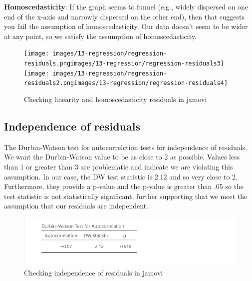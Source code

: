 \documentclass[
]{book}
\begin{document}
\textbf{Homoscedasticity}: If the graph seems to funnel (e.g., widely dispersed on one end of the x-axis and narrowly dispersed on the other end), then that suggests you fail the assumption of homoscedasticity. Our data doesn't seem to be wider at any point, so we satisfy the assumption of homoscedasticity.

\begin{figure}

{\centering \texttt{[image: images/13-regression/regression-residuals.pngimages/13-regression/regression-residuals3]} \texttt{[image: images/13-regression/regression-residuals2.pngimages/13-regression/regression-residuals4]} 

}

\caption{Checking linearity and homoscedasticity residuals in jamovi}\label{fig:unnamed-chunk-8}
\end{figure}

\hypertarget{independence-of-residuals}{%
\subsection{Independence of residuals}\label{independence-of-residuals}}

The Durbin-Watson test for autocorrelction tests for independence of residuals. We want the Durbin-Watson value to be as close to 2 as possible. Values less than 1 or greater than 3 are problematic and indicate we are violating this assumption. In our case, the DW test statistic is 2.12 and so very close to 2. Furthermore, they provide a p-value and the p-value is greater than .05 so the test statistic is not statistically significant, further supporting that we meet the assumption that our residuals are independent.

\begin{figure}

{\centering \includegraphics[width=1\linewidth]{images/13-regression/regression-durbinwatson} 

}

\caption{Checking independence of residuals in jamovi}\label{fig:unnamed-chunk-9}
\end{figure}
\end{document}
